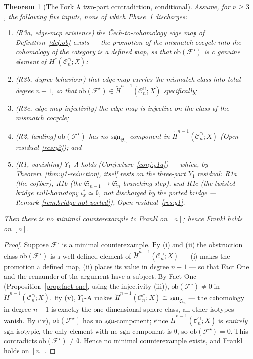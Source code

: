 \documentclass[11pt,oneside]{amsart}
\theoremstyle{plain}
\newtheorem{theorem}{Theorem}[section]
\theoremstyle{definition}
\theoremstyle{remark}
\theoremstyle{honeststyle}
\newcommand{\F}{\mathcal{F}}
\newcommand{\Fstar}{\F^{\star}}
\newcommand{\sgn}{\mathrm{sgn}}
\newcommand{\Sym}{\mathfrak{S}}
\newcommand{\Cn}{\mathcal{C}^{\cap}_n}
\newcommand{\ob}{\mathrm{ob}}
\begin{document}
\begin{theorem}[The Fork A two-part contradiction, conditional]
\label{thm:contradiction}
Assume, for $n\ge3$, the following five inputs, none of which Phase~1
discharges:
\begin{enumerate}[label=\textup{(\roman*)},leftmargin=2.4em]
\item \textup{(R3a, edge-map existence)} the
  \v{C}ech-to-cohomology edge map of Definition~\ref{def:ob}
  \emph{exists} --- the promotion of the mismatch cocycle into the
  cohomology of the category is a defined map, so that $\ob(\Fstar)$
  is a genuine element of $H^{*}(\Cn;X)$;
\item \textup{(R3b, degree behaviour)} that edge map carries the
  mismatch class into total degree $n-1$, so that
  $\ob(\Fstar)\in\widetilde H^{n-1}(\Cn;X)$ specifically;
\item \textup{(R3c, edge-map injectivity)} the edge map is
  \emph{injective} on the class of the mismatch cocycle;
\item \textup{(R2, landing)} $\ob(\Fstar)$ has no
  $\sgn_{\Sym_n}$-component in $\widetilde H^{n-1}(\Cn;X)$ (Open
  residual~\ref{res:y2}); and
\item \textup{(R1, vanishing)} $Y_1$-A holds
  (Conjecture~\ref{conj:y1a}) --- which, by
  Theorem~\ref{thm:y1-reduction}, itself rests on the three-part
  $Y_1$ residual: R1a (the cofiber), R1b (the $\Sym_{n-1}\to\Sym_n$
  branching step), and R1c (the twisted-bridge null-homotopy
  $\iota_x^{*}\simeq0$, not discharged by the ported bridge ---
  Remark~\ref{rem:bridge-not-ported}), Open residual~\ref{res:y1}.
\end{enumerate}
Then there is no minimal counterexample to Frankl on $[n]$; hence
Frankl holds on $[n]$.
\end{theorem}

\begin{proof}
Suppose $\Fstar$ is a minimal counterexample. By (i) and (ii) the
obstruction class $\ob(\Fstar)$ is a well-defined element of
$\widetilde H^{n-1}(\Cn;X)$ --- (i) makes the promotion a defined map,
(ii) places its value in degree $n-1$ --- so that Fact One and the
remainder of the argument have a subject. By Fact One
(Proposition~\ref{prop:fact-one}, using the injectivity (iii)),
$\ob(\Fstar)\neq0$ in $\widetilde H^{n-1}(\Cn;X)$. By (v), $Y_1$-A
makes $\widetilde H^{n-1}(\Cn;X)\cong\sgn_{\Sym_n}$ --- the cohomology
in degree $n-1$ is exactly the one-dimensional sphere class, all other
isotypes vanish. By (iv), $\ob(\Fstar)$ has no $\sgn$-component; since
$\widetilde H^{n-1}(\Cn;X)$ is \emph{entirely} $\sgn$-isotypic, the
only element with no $\sgn$-component is $0$, so $\ob(\Fstar)=0$. This
contradicts $\ob(\Fstar)\neq0$. Hence no minimal counterexample
exists, and Frankl holds on $[n]$.
\end{proof}
\end{document}
